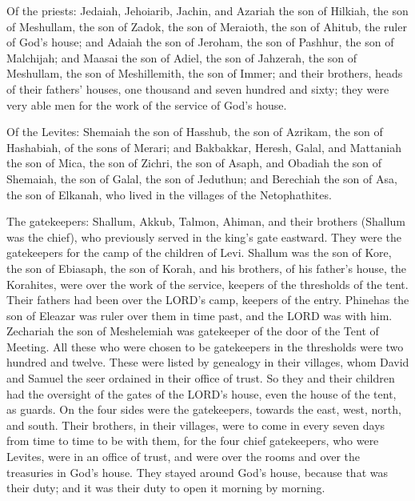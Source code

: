  Of the priests: Jedaiah, Jehoiarib, Jachin,
 and Azariah the son of Hilkiah, the son of Meshullam,
the son of Zadok, the son of Meraioth, the son of Ahitub, the ruler of
God's house;  and Adaiah the son of Jeroham, the son of
Pashhur, the son of Malchijah; and Maasai the son of Adiel, the son of
Jahzerah, the son of Meshullam, the son of Meshillemith, the son of
Immer;  and their brothers, heads of their fathers'
houses, one thousand and seven hundred and sixty; they were very able
men for the work of the service of God's house.

 Of the Levites: Shemaiah the son of Hasshub, the son of
Azrikam, the son of Hashabiah, of the sons of Merari; 
and Bakbakkar, Heresh, Galal, and Mattaniah the son of Mica, the son of
Zichri, the son of Asaph,  and Obadiah the son of
Shemaiah, the son of Galal, the son of Jeduthun; and Berechiah the son
of Asa, the son of Elkanah, who lived in the villages of the
Netophathites.

 The gatekeepers: Shallum, Akkub, Talmon, Ahiman, and
their brothers (Shallum was the chief),  who previously
served in the king's gate eastward. They were the gatekeepers for the
camp of the children of Levi.  Shallum was the son of
Kore, the son of Ebiasaph, the son of Korah, and his brothers, of his
father's house, the Korahites, were over the work of the service,
keepers of the thresholds of the tent. Their fathers had been over the
LORD's camp, keepers of the entry.  Phinehas the son of
Eleazar was ruler over them in time past, and the LORD was with him.
 Zechariah the son of Meshelemiah was gatekeeper of the
door of the Tent of Meeting.  All these who were chosen
to be gatekeepers in the thresholds were two hundred and twelve. These
were listed by genealogy in their villages, whom David and Samuel the
seer ordained in their office of trust.  So they and
their children had the oversight of the gates of the LORD's house, even
the house of the tent, as guards.  On the four sides were
the gatekeepers, towards the east, west, north, and south.
 Their brothers, in their villages, were to come in every
seven days from time to time to be with them,  for the
four chief gatekeepers, who were Levites, were in an office of trust,
and were over the rooms and over the treasuries in God's house.
 They stayed around God's house, because that was their
duty; and it was their duty to open it morning by morning.

